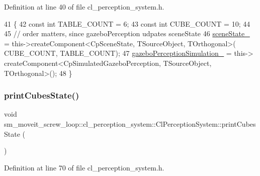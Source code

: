 Definition at line 40 of file cl\+\_\+perception\+\_\+system.\+h.


\begin{DoxyCode}
41             \{
42                 \textcolor{keyword}{const} \textcolor{keywordtype}{int} TABLE\_COUNT = 6;
43                 \textcolor{keyword}{const} \textcolor{keywordtype}{int} CUBE\_COUNT = 10;
44 
45                 \textcolor{comment}{// order matters, since gazeboPerception udpates sceneState}
46                 \hyperlink{classsm__moveit__screw__loop_1_1cl__perception__system_1_1ClPerceptionSystem_abb08b3cc6d4ec414a608da92133b1f66}{sceneState\_} = this->createComponent<CpSceneState, TSourceObject, TOrthogonal>(
      CUBE\_COUNT, TABLE\_COUNT);
47                 \hyperlink{classsm__moveit__screw__loop_1_1cl__perception__system_1_1ClPerceptionSystem_a45b844a21cd538d4c8e757bf706e6303}{gazeboPerceptionSimulation\_} = this->
      createComponent<CpSimulatedGazeboPerception, TSourceObject, TOrthogonal>();
48             \}
\end{DoxyCode}
\mbox{\label{classsm__moveit__screw__loop_1_1cl__perception__system_1_1ClPerceptionSystem_ae6355186bed36a732791854be792e200}} 
\subsubsection{\texorpdfstring{print\+Cubes\+State()}{printCubesState()}}
{\footnotesize\ttfamily void sm\+\_\+moveit\+\_\+screw\+\_\+loop\+::cl\+\_\+perception\+\_\+system\+::\+Cl\+Perception\+System\+::print\+Cubes\+State (\begin{DoxyParamCaption}{ }\end{DoxyParamCaption})\hspace{0.3cm}{\ttfamily [inline]}}



Definition at line 70 of file cl\+\_\+perception\+\_\+system.\+h.



